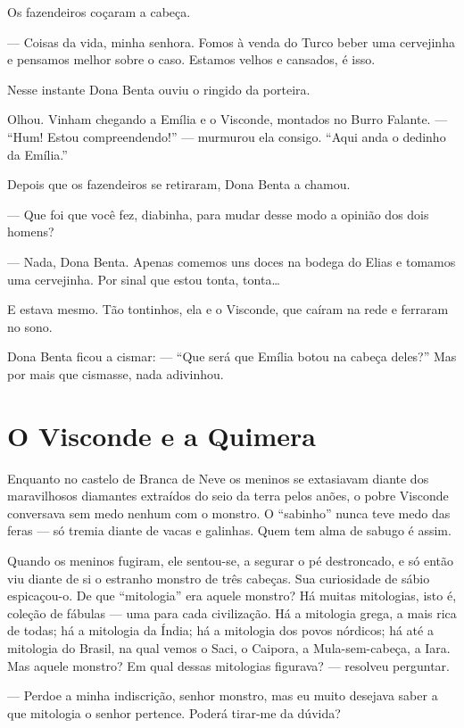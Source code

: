 Os fazendeiros coçaram a cabeça.

--- Coisas da vida, minha senhora. Fomos à venda do Turco beber uma
cervejinha e pensamos melhor sobre o caso. Estamos velhos e cansados, é
isso.

Nesse instante Dona Benta ouviu o ringido da porteira.

Olhou. Vinham chegando a Emília e o Visconde, montados no Burro Falante.
--- ``Hum! Estou compreendendo!'' --- murmurou ela consigo. ``Aqui anda
o dedinho da Emília.''

Depois que os fazendeiros se retiraram, Dona Benta a chamou.

--- Que foi que você fez, diabinha, para mudar desse modo a opinião dos
dois homens?

--- Nada, Dona Benta. Apenas comemos uns doces na bodega do Elias e
tomamos uma cervejinha. Por sinal que estou tonta, tonta\ldots{}

E estava mesmo. Tão tontinhos, ela e o Visconde, que caíram na rede e
ferraram no sono.

Dona Benta ficou a cismar: --- ``Que será que Emília botou na cabeça
deles?'' Mas por mais que cismasse, nada adivinhou.


\chapter{O Visconde e a Quimera}

Enquanto no castelo de Branca de Neve os meninos se extasiavam diante
dos maravilhosos diamantes extraídos do seio da terra pelos anões, o
pobre Visconde conversava sem medo nenhum com o monstro. O ``sabinho''
nunca teve medo das feras --- só tremia diante de vacas e galinhas. Quem
tem alma de sabugo é assim.

Quando os meninos fugiram, ele sentou-se, a segurar o pé destroncado, e
só então viu diante de si o estranho monstro de três cabeças. Sua
curiosidade de sábio espicaçou-o. De que ``mitologia'' era aquele
monstro? Há muitas mitologias, isto é, coleção de fábulas --- uma para
cada civilização. Há a mitologia grega, a mais rica de todas; há a
mitologia da Índia; há a mitologia dos povos nórdicos; há até a
mitologia do Brasil, na qual vemos o Saci, o Caipora, a Mula-sem-cabeça,
a Iara. Mas aquele monstro? Em qual dessas mitologias figurava? ---
resolveu perguntar.

--- Perdoe a minha indiscrição, senhor monstro, mas eu muito desejava
saber a que mitologia o senhor pertence. Poderá tirar-me da dúvida?

